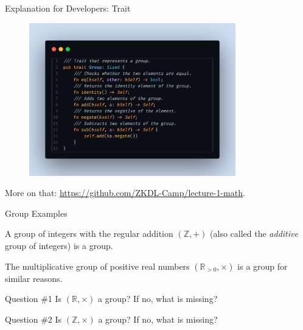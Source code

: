 \documentclass{beamer}
\begin{document}
    \begin{frame}{Explanation for Developers: Trait}
      \begin{center}
        \begin{figure}
          \includegraphics[width=0.8\textwidth]{images/lecture_1/group_in_rust.png}
          \label{fig:group_in_rust}
        \end{figure}

        More on that: \url{https://github.com/ZKDL-Camp/lecture-1-math}.
      \end{center}
    \end{frame}

    \begin{frame}{Group Examples}
      \begin{example}
        A group of integers with the regular addition $(\mathbb{Z},+)$ (also called the \textit{additive} group of integers) is a group.
      \end{example}
      
      \begin{example}
          The multiplicative group of positive real numbers $(\mathbb{R}_{> 0}, \times)$ is a group for similar reasons. 
      \end{example}
      
      \begin{alertblock}{Question \#1}
          Is $(\mathbb{R}, \times)$ a group? If no, what is missing?
      \end{alertblock}

      \begin{alertblock}{Question \#2}
        Is $(\mathbb{Z}, \times)$ a group? If no, what is missing?
      \end{alertblock}
    \end{frame}
\end{document}
